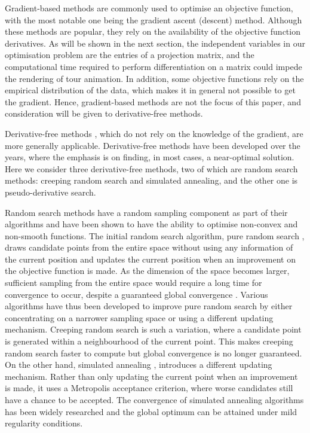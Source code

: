 Gradient-based methods are commonly used to optimise an objective
function, with the most notable one being the gradient ascent (descent)
method. Although these methods are popular, they rely on the
availability of the objective function derivatives. As will be shown in
the next section, the independent variables in our optimisation problem
are the entries of a projection matrix, and the computational time
required to perform differentiation on a matrix could impede the
rendering of tour animation. In addition, some objective functions rely
on the empirical distribution of the data, which makes it in general not
possible to get the gradient. Hence, gradient-based methods are not the
focus of this paper, and consideration will be given to derivative-free
methods.

Derivative-free methods
\citep{conn2009introduction, rios2013derivative}, which do not rely on
the knowledge of the gradient, are more generally applicable.
Derivative-free methods have been developed over the years, where the
emphasis is on finding, in most cases, a near-optimal solution. Here we
consider three derivative-free methods, two of which are random search
methods: creeping random search and simulated annealing, and the other
one is pseudo-derivative search.

Random search methods
\citep{Romeijn2009, zabinsky2013stochastic, andradottir2015review} have
a random sampling component as part of their algorithms and have been
shown to have the ability to optimise non-convex and non-smooth
functions. The initial random search algorithm, pure random search
\citep{Brooks1958-zk}, draws candidate points from the entire space
without using any information of the current position and updates the
current position when an improvement on the objective function is made.
As the dimension of the space becomes larger, sufficient sampling from
the entire space would require a long time for convergence to occur,
despite a guaranteed global convergence \citep{spall2005introduction}.
Various algorithms have thus been developed to improve pure random
search by either concentrating on a narrower sampling space or using a
different updating mechanism. Creeping random search
\citep{White1971-ci} is such a variation, where a candidate point is
generated within a neighbourhood of the current point. This makes
creeping random search faster to compute but global convergence is no
longer guaranteed. On the other hand, simulated annealing
\citep{kirkpatrick1983optimization, bertsimas1993simulated}, introduces
a different updating mechanism. Rather than only updating the current
point when an improvement is made, it uses a Metropolis acceptance
criterion, where worse candidates still have a chance to be accepted.
The convergence of simulated annealing algorithms has been widely
researched \citep{mitra1986convergence, granville1994simulated} and the
global optimum can be attained under mild regularity conditions.

